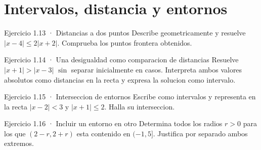 \documentclass[10pt,a4paper,oneside,openany]{book}
\begin{document}
\section{Intervalos, distancia y entornos}
\begin{PSevenExerciseFixed}{Ejercicio 1.13 · Distancias a dos puntos}
Describe geometricamente y resuelve \(|x-4|\le 2|x+2|\). Comprueba los puntos frontera obtenidos.
\end{PSevenExerciseFixed}
\begin{PSevenExerciseFixed}{Ejercicio 1.14 · Una desigualdad como comparacion de distancias}
Resuelve \(|x+1|>|x-3|\) \(\sin\) separar inicialmente en casos. Interpreta ambos valores absolutos como distancias en la recta y expresa la solucion como intervalo.
\end{PSevenExerciseFixed}
\begin{PSevenExerciseFixed}{Ejercicio 1.15 · Interseccion de entornos}
Escribe como intervalos y representa en la recta \(|x-2|<3\) y \(|x+1|\le 2\). Halla su interseccion.
\end{PSevenExerciseFixed}
\begin{PSevenExerciseFixed}{Ejercicio 1.16 · Incluir un entorno en otro}
Determina todos los radios \(r>0\) para los que \((2-r,2+r)\) esta contenido en \((-1,5]\). Justifica por separado ambos extremos.
\end{PSevenExerciseFixed}
\end{document}
